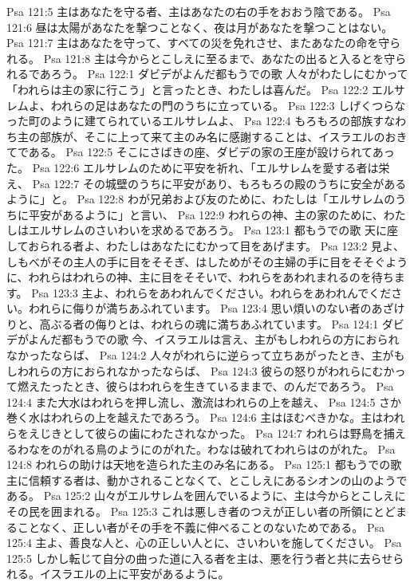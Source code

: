 Psa 121:5  主はあなたを守る者、主はあなたの右の手をおおう陰である。
Psa 121:6  昼は太陽があなたを撃つことなく、夜は月があなたを撃つことはない。
Psa 121:7  主はあなたを守って、すべての災を免れさせ、またあなたの命を守られる。
Psa 121:8  主は今からとこしえに至るまで、あなたの出ると入るとを守られるであろう。
Psa 122:1  ダビデがよんだ都もうでの歌 人々がわたしにむかって「われらは主の家に行こう」と言ったとき、わたしは喜んだ。
Psa 122:2  エルサレムよ、われらの足はあなたの門のうちに立っている。
Psa 122:3  しげくつらなった町のように建てられているエルサレムよ、
Psa 122:4  もろもろの部族すなわち主の部族が、そこに上って来て主のみ名に感謝することは、イスラエルのおきてである。
Psa 122:5  そこにさばきの座、ダビデの家の王座が設けられてあった。
Psa 122:6  エルサレムのために平安を祈れ、「エルサレムを愛する者は栄え、
Psa 122:7  その城壁のうちに平安があり、もろもろの殿のうちに安全があるように」と。
Psa 122:8  わが兄弟および友のために、わたしは「エルサレムのうちに平安があるように」と言い、
Psa 122:9  われらの神、主の家のために、わたしはエルサレムのさいわいを求めるであろう。
Psa 123:1  都もうでの歌 天に座しておられる者よ、わたしはあなたにむかって目をあげます。
Psa 123:2  見よ、しもべがその主人の手に目をそそぎ、はしためがその主婦の手に目をそそぐように、われらはわれらの神、主に目をそそいで、われらをあわれまれるのを待ちます。
Psa 123:3  主よ、われらをあわれんでください。われらをあわれんでください。われらに侮りが満ちあふれています。
Psa 123:4  思い煩いのない者のあざけりと、高ぶる者の侮りとは、われらの魂に満ちあふれています。
Psa 124:1  ダビデがよんだ都もうでの歌 今、イスラエルは言え、主がもしわれらの方におられなかったならば、
Psa 124:2  人々がわれらに逆らって立ちあがったとき、主がもしわれらの方におられなかったならば、
Psa 124:3  彼らの怒りがわれらにむかって燃えたったとき、彼らはわれらを生きているままで、のんだであろう。
Psa 124:4  また大水はわれらを押し流し、激流はわれらの上を越え、
Psa 124:5  さか巻く水はわれらの上を越えたであろう。
Psa 124:6  主はほむべきかな。主はわれらをえじきとして彼らの歯にわたされなかった。
Psa 124:7  われらは野鳥を捕えるわなをのがれる鳥のようにのがれた。わなは破れてわれらはのがれた。
Psa 124:8  われらの助けは天地を造られた主のみ名にある。
Psa 125:1  都もうでの歌 主に信頼する者は、動かされることなくて、とこしえにあるシオンの山のようである。
Psa 125:2  山々がエルサレムを囲んでいるように、主は今からとこしえにその民を囲まれる。
Psa 125:3  これは悪しき者のつえが正しい者の所領にとどまることなく、正しい者がその手を不義に伸べることのないためである。
Psa 125:4  主よ、善良な人と、心の正しい人とに、さいわいを施してください。
Psa 125:5  しかし転じて自分の曲った道に入る者を主は、悪を行う者と共に去らせられる。イスラエルの上に平安があるように。
